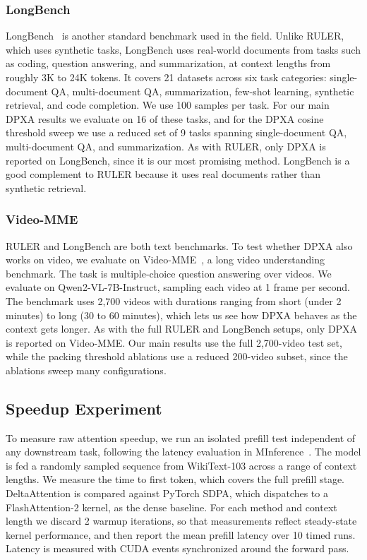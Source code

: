 \subsubsection{LongBench}

LongBench~\cite{bai2024longbench} is another standard benchmark used in the field. Unlike RULER, which uses synthetic tasks, LongBench uses real-world documents from tasks such as coding, question answering, and summarization, at context lengths from roughly 3K to 24K tokens. It covers 21 datasets across six task categories: single-document QA, multi-document QA, summarization, few-shot learning, synthetic retrieval, and code completion. We use 100 samples per task. For our main DPXA results we evaluate on 16 of these tasks, and for the DPXA cosine threshold sweep we use a reduced set of 9 tasks spanning single-document QA, multi-document QA, and summarization. As with RULER, only DPXA is reported on LongBench, since it is our most promising method. LongBench is a good complement to RULER because it uses real documents rather than synthetic retrieval.

\subsubsection{Video-MME}

RULER and LongBench are both text benchmarks. To test whether DPXA also works on video, we evaluate on Video-MME~\cite{fu2024videomme}, a long video understanding benchmark. The task is multiple-choice question answering over videos. We evaluate on Qwen2-VL-7B-Instruct, sampling each video at 1 frame per second. The benchmark uses 2,700 videos with durations ranging from short (under 2 minutes) to long (30 to 60 minutes), which lets us see how DPXA behaves as the context gets longer. As with the full RULER and LongBench setups, only DPXA is reported on Video-MME. Our main results use the full 2,700-video test set, while the packing threshold ablations use a reduced 200-video subset, since the ablations sweep many configurations.

\subsection{Speedup Experiment}

To measure raw attention speedup, we run an isolated prefill test independent of any downstream task, following the latency evaluation in MInference~\cite{jiang2024minference}. The model is fed a randomly sampled sequence from WikiText-103 across a range of context lengths. We measure the time to first token, which covers the full prefill stage. DeltaAttention is compared against PyTorch SDPA, which dispatches to a FlashAttention-2 kernel, as the dense baseline. For each method and context length we discard 2 warmup iterations, so that measurements reflect steady-state kernel performance, and then report the mean prefill latency over 10 timed runs. Latency is measured with CUDA events synchronized around the forward pass.
